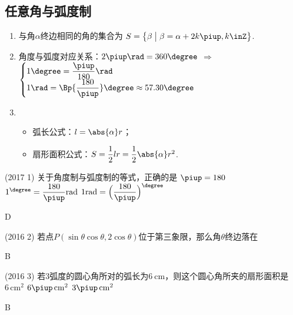   \subsection{任意角与弧度制}
    \begin{enumerate}[label=\arabic*)]
      \item 与角$ \alpha $终边相同的角的集合为
        $ S=\bigl\{\beta \bigm| \beta =\alpha+2k\piup,k\inZ\bigr\} $.
      \item 角度与弧度对应关系：$2\piup\rad=360\degree$
        $\Rightarrow$
        $\begin{cases}
          1\degree=\dfrac{\piup}{180}\rad\\
          1\rad=\Bp{\dfrac{180}{\piup}}\degree\approx57.30\degree
        \end{cases}$
      \item
        \begin{itemize}
          \item 弧长公式：$l=\abs{\alpha}r$；
          \item 扇形面积公式：$S=\dfrac12 lr=\dfrac12 \abs{\alpha}r^2$.
        \end{itemize}
    \end{enumerate}
    \begin{exercise}
      \item%
        (2017  1)
        关于角度制与弧度制的等式，正确的是\xz
          {$\piup=180$}
          {$1^{\degree}=\dfrac{180}{\piup}\rm{rad}$}
          {$1\rm{rad}=\Bigl(\dfrac{180}{\piup}\Bigr)^\degree$}
        \begin{answer}
          D
        \end{answer}
      \item%
        (2016  2)
        若点$P(\sin\theta\cos\theta,2\cos\theta)$位于第三象限，那么角$\theta$终边落在\xz
        \begin{answer}
          B
        \end{answer}
      \item%
        (2016  3)
        若3弧度的圆心角所对的弧长为$\SI{6}{\cm}$，则这个圆心角所夹的扇形面积是\xz
         {$6\,\mathrm{cm}^{\mathrm2}$}
         {$6\piup\,\mathrm{cm}^{\mathrm2}$}
         {$3\piup\,\mathrm{cm}^{\mathrm2}$}
        \begin{answer}
          B
        \end{answer}
    \end{exercise}
  \vspace{0.5cm}
